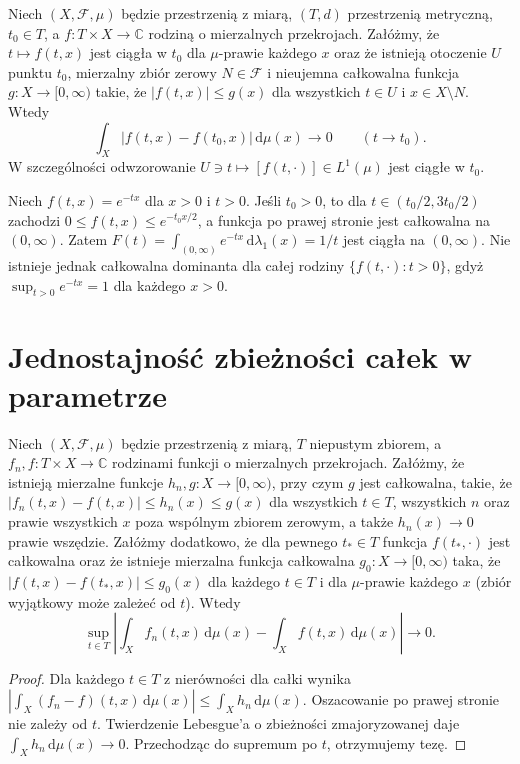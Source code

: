 \begin{wniosek}
\label{cor:l1-param-11}
Niech $(X,\mathcal F,\mu)$ będzie przestrzenią z miarą,
$(T,d)$ przestrzenią metryczną, $t_0\in T$,
a $f:T\times X\to\mathbb C$ rodziną o mierzalnych
przekrojach. Załóżmy, że $t\mapsto f(t,x)$ jest ciągła
w $t_0$ dla $\mu$-prawie każdego $x$ oraz że istnieją
otoczenie $U$ punktu $t_0$, mierzalny zbiór zerowy
$N\in\mathcal F$ i nieujemna całkowalna funkcja
$g:X\to[0,\infty)$ takie, że
$|f(t,x)|\le g(x)$ dla wszystkich $t\in U$
i $x\in X\setminus N$. Wtedy
\[
\int_X|f(t,x)-f(t_0,x)|\,\mathrm d\mu(x)\longrightarrow0
\qquad(t\to t_0).
\]
W szczególności odwzorowanie
$U\ni t\mapsto[f(t,\cdot)]\in L^1(\mu)$ jest
ciągłe w $t_0$.
\end{wniosek}

\begin{przyklad}
Niech $f(t,x)=e^{-tx}$ dla $x>0$ i $t>0$. Jeśli $t_0>0$,
to dla $t\in(t_0/2,3t_0/2)$ zachodzi
$0\le f(t,x)\le e^{-t_0x/2}$, a funkcja po prawej stronie
jest całkowalna na $(0,\infty)$. Zatem
$F(t)=\int_{(0,\infty)}e^{-tx}\,\mathrm d\lambda_1(x)=1/t$
jest ciągła na $(0,\infty)$. Nie istnieje jednak całkowalna
dominanta dla całej rodziny $\{f(t,\cdot):t>0\}$, gdyż
$\sup_{t>0} e^{-tx}=1$ dla każdego $x>0$.
\end{przyklad}

\section{Jednostajność zbieżności całek w parametrze}

\begin{twierdzenie}
\label{thm:uniform-parameter-11}
Niech $(X,\mathcal F,\mu)$ będzie przestrzenią z miarą,
$T$ niepustym zbiorem, a $f_n,f:T\times X\to\mathbb C$
rodzinami funkcji o mierzalnych przekrojach.
Załóżmy, że istnieją mierzalne funkcje
$h_n,g:X\to[0,\infty)$, przy czym $g$ jest całkowalna, takie, że
$|f_n(t,x)-f(t,x)|\le h_n(x)\le g(x)$
dla wszystkich $t\in T$, wszystkich $n$ oraz prawie wszystkich
$x$ poza wspólnym zbiorem zerowym, a także $h_n(x)\to0$
prawie wszędzie. Załóżmy dodatkowo, że dla pewnego
$t_*\in T$ funkcja $f(t_*,\cdot)$ jest całkowalna oraz że
istnieje mierzalna funkcja całkowalna
$g_0:X\to[0,\infty)$ taka, że
$|f(t,x)-f(t_*,x)|\le g_0(x)$ dla każdego $t\in T$
i dla $\mu$-prawie każdego $x$ (zbiór wyjątkowy
może zależeć od $t$). Wtedy
\[
\sup_{t\in T}\left|\int_X f_n(t,x)\,\mathrm d\mu(x)
-\int_Xf(t,x)\,\mathrm d\mu(x)\right|\longrightarrow0.
\]
\end{twierdzenie}
\begin{proof}
Dla każdego $t\in T$ z nierówności dla całki wynika
$|\int_X(f_n-f)(t,x)\,\mathrm d\mu(x)|\le\int_Xh_n\,\mathrm d\mu(x)$.
Oszacowanie po prawej stronie nie zależy od $t$.
Twierdzenie Lebesgue'a o zbieżności zmajoryzowanej daje
$\int_Xh_n\,\mathrm d\mu(x)\to0$. Przechodząc do supremum
po $t$, otrzymujemy tezę.
\end{proof}

